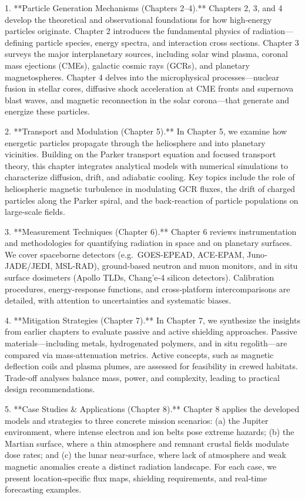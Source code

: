 \documentclass[12pt]{report}
\begin{document}
1. **Particle Generation Mechanisms (Chapters 2–4).**  
   Chapters 2, 3, and 4 develop the theoretical and observational foundations for how high‐energy particles originate.  Chapter 2 introduces the fundamental physics of radiation—defining particle species, energy spectra, and interaction cross sections.  Chapter 3 surveys the major interplanetary sources, including solar wind plasma, coronal mass ejections (CMEs), galactic cosmic rays (GCRs), and planetary magnetospheres.  Chapter 4 delves into the microphysical processes—nuclear fusion in stellar cores, diffusive shock acceleration at CME fronts and supernova blast waves, and magnetic reconnection in the solar corona—that generate and energize these particles.

2. **Transport and Modulation (Chapter 5).**  
   In Chapter 5, we examine how energetic particles propagate through the heliosphere and into planetary vicinities.  Building on the Parker transport equation and focused transport theory, this chapter integrates analytical models with numerical simulations to characterize diffusion, drift, and adiabatic cooling.  Key topics include the role of heliospheric magnetic turbulence in modulating GCR fluxes, the drift of charged particles along the Parker spiral, and the back‐reaction of particle populations on large‐scale fields.

3. **Measurement Techniques (Chapter 6).**  
   Chapter 6 reviews instrumentation and methodologies for quantifying radiation in space and on planetary surfaces.  We cover spaceborne detectors (e.g.\ GOES‐EPEAD, ACE‐EPAM, Juno‐JADE/JEDI, MSL‐RAD), ground‐based neutron and muon monitors, and in situ surface dosimeters (Apollo TLDs, Chang’e‐4 silicon detectors).  Calibration procedures, energy‐response functions, and cross‐platform intercomparisons are detailed, with attention to uncertainties and systematic biases.

4. **Mitigation Strategies (Chapter 7).**  
   In Chapter 7, we synthesize the insights from earlier chapters to evaluate passive and active shielding approaches.  Passive materials—including metals, hydrogenated polymers, and in situ regolith—are compared via mass‐attenuation metrics.  Active concepts, such as magnetic deflection coils and plasma plumes, are assessed for feasibility in crewed habitats.  Trade‐off analyses balance mass, power, and complexity, leading to practical design recommendations.

5. **Case Studies & Applications (Chapter 8).**  
   Chapter 8 applies the developed models and strategies to three concrete mission scenarios: (a) the Jupiter environment, where intense electron and ion belts pose extreme hazards; (b) the Martian surface, where a thin atmosphere and remnant crustal fields modulate dose rates; and (c) the lunar near‐surface, where lack of atmosphere and weak magnetic anomalies create a distinct radiation landscape.  For each case, we present location‐specific flux maps, shielding requirements, and real‐time forecasting examples.
\end{document}
